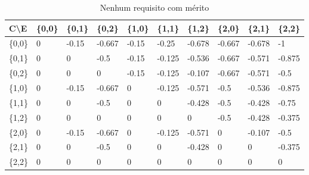 \documentclass[preprint,12pt]{elsarticle}
\begin{document}
\begin{table}[h]
\caption{Nenhum requisito com mérito}
\label{table:merit-0-all}
\begin{tabular}{@{}llllllllll@{}}
\toprule
C\textbackslash E & \{0,0\} & \{0,1\} & \{0,2\} & \{1,0\} & \{1,1\} & \{1,2\} & \{2,0\} & \{2,1\} & \{2,2\} \\ \midrule
\{0,0\} & 0 & -0.15 & -0.667 & -0.15 & -0.25 & -0.678 & -0.667 & -0.678 & -1 \\
\{0,1\} & 0 & 0 & -0.5 & -0.15 & -0.125 & -0.536 & -0.667 & -0.571 & -0.875 \\
\{0,2\} & 0 & 0 & 0 & -0.15 & -0.125 & -0.107 & -0.667 & -0.571 & -0.5 \\
\{1,0\} & 0 & -0.15 & -0.667 & 0 & -0.125 & -0.571 & -0.5 & -0.536 & -0.875 \\
\{1,1\} & 0 & 0 & -0.5 & 0 & 0 & -0.428 & -0.5 & -0.428 & -0.75 \\
\{1,2\} & 0 & 0 & 0 & 0 & 0 & 0 & -0.5 & -0.428 & -0.375 \\
\{2,0\} & 0 & -0.15 & -0.667 & 0 & -0.125 & -0.571 & 0 & -0.107 & -0.5 \\
\{2,1\} & 0 & 0 & -0.5 & 0 & 0 & -0.428 & 0 & 0 & -0.375 \\
\{2,2\} & 0 & 0 & 0 & 0 & 0 & 0 & 0 & 0 & 0 \\ 
\bottomrule
\end{tabular}
\end{table}





\end{document}
